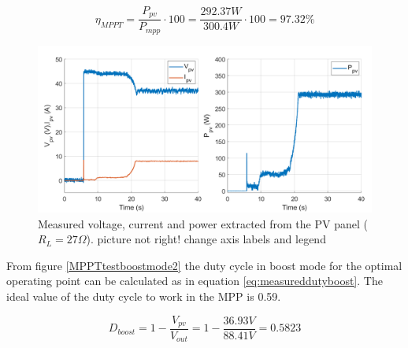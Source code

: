 \begin{equation} \label{eq:effMPPTboost}
\eta_{MPPT}= \dfrac{P_{pv}}{P_{mpp}} \cdot 100 = \dfrac{292.37W}{300.4W} \cdot 100 = 97.32\%  
\end{equation}


\begin{figure}[H]
	\begin{center}
		\includegraphics[width=1\textwidth]{../Pictures/P1/Test/Boost_mode_MPPT_Vin_Iin_Pin}
		\caption{Measured voltage, current and power extracted from the PV panel ($R_{L}=27\Omega$). picture not right! change axis labels and legend}
		\label{MPPTtestboostmode1}
	\end{center}	
\end{figure}


From figure \ref{MPPTtestboostmode2} the duty cycle in boost mode for the optimal operating point can be calculated as in equation \ref{eq:measureddutyboost}. The ideal value of the duty cycle to work in the MPP is 0.59.

\begin{equation} \label{eq:measureddutyboost}
D_{boost}= 1 - \dfrac{V_{pv}}{V_{out}} = 1 - \dfrac{36.93V}{88.41V} = 0.5823
\end{equation}

